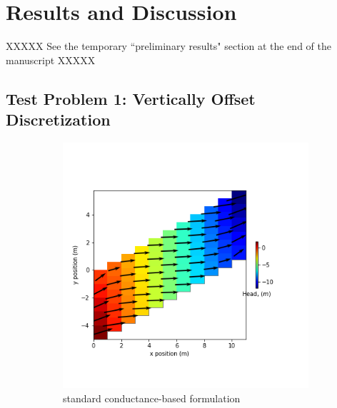 \documentclass{article}
\begin{document}
\section{Results and Discussion}

XXXXX See the temporary ``preliminary results" section at the end of the manuscript XXXXX

\subsection{Test Problem 1: Vertically Offset Discretization}

\begin{figure}[H]
\centering
\begin{subfigure}{0.4\textwidth}
	\includegraphics[width=\textwidth]{../figures/disu-s-nocc-head.png}
	\caption{standard conductance-based formulation}
	\label{fig:disu-s-nocc-head}
\end{subfigure}
\hfill
\begin{subfigure}{0.4\textwidth}

\end{subfigure}
\end{figure}
\end{document}
